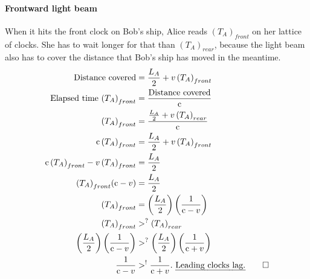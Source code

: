 \documentclass[pagesize,headsepline,10pt,parskip=half]{scrreprt}
\newcommand{\const}[1]{\ensuremath{\mathrm{#1}}}
\renewcommand{\c}{\const{c}}
\begin{document}
        \paragraph{Frontward light beam}
          When it hits the front clock on Bob's ship, Alice
          reads ${(T_A)}_{front}$ on her lattice of clocks. She has to wait
          longer for that than ${(T_A)}_{rear}$, because the light beam also
          has to cover the distance that Bob's ship has moved in the meantime.
          \begin{align*}
            \text{Distance covered} &= \frac{L_A}{2} + v \, {(T_A)}_{front} \\
            \text{Elapsed time } {(T_A)}_{front} &= \frac{\text{Distance covered}}{\c}\\
            {(T_A)}_{front} &= \frac{\frac{L_A}{2} + v \, {(T_A)}_{rear}}{\c}\\
            \c \, {(T_A)}_{front} &= \frac{L_A}{2} + v \, {(T_A)}_{front}\\
            \c \, {(T_A)}_{front} - v \, {(T_A)}_{front} &= \frac{L_A}{2}\\
            {(T_A)}_{front} (\c - v) &= \frac{L_A}{2}\\
            {(T_A)}_{front} &= \left(\frac{L_A}{2}\right)\left(\frac{1}{\c - v}\right)\\
            {(T_A)}_{front} &>^? {(T_A)}_{rear}\\
            \left(\frac{L_A}{2}\right)\left(\frac{1}{\c - v}\right) &>^? \left(\frac{L_A}{2}\right)\left(\frac{1}{\c + v}\right)\\
            \frac{1}{\c - v} &>^! \frac{1}{\c + v}. \text{ \emph{Leading clocks lag.}} \qed
          \end{align*}
\end{document}

